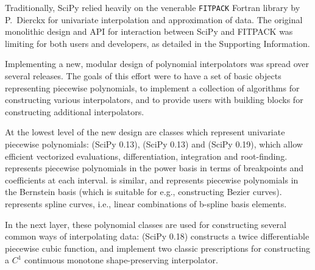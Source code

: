 Traditionally, SciPy relied heavily on the venerable \texttt{FITPACK}
Fortran library by P.~Dierckx \cite{Dierckx:1993:CSF:151103, FITPACK} for
univariate interpolation and approximation of data. The original monolithic
design and API for interaction between SciPy and FITPACK was limiting for both
users and developers, as detailed in the Supporting Information.

Implementing a new, modular design of polynomial interpolators was spread over
several releases. The goals of this effort were to have a set of basic objects
representing piecewise polynomials, to implement a collection of algorithms
for constructing various interpolators, and to provide users with building
blocks for constructing additional interpolators.

At the lowest level of the new design are classes which represent univariate
piecewise polynomials:  (SciPy 0.13)\cite{scipy-gh5827},
 (SciPy 0.13) and  (SciPy 0.19)\cite{scipy-gh3174},
which allow
efficient vectorized evaluations, differentiation, integration and root-finding.
 represents piecewise polynomials in the power basis in terms of
breakpoints and coefficients at each interval.  is similar, and
represents piecewise polynomials in the Bernstein basis (which is suitable
for e.g., constructing Bezier curves).  represents spline
curves, i.e., linear combinations of b-spline basis elements.\cite{deBoor1978} 

In the next layer, these polynomial classes are used for constructing several
common ways of interpolating data:  (SciPy 0.18)
\cite{scipy-gh5653} constructs a twice 
differentiable piecewise cubic function,  
and  implement two classic prescriptions for
constructing a $C^1$ continuous monotone shape-preserving interpolator.
\cite{FritschCarlson1980, Akima1970}
